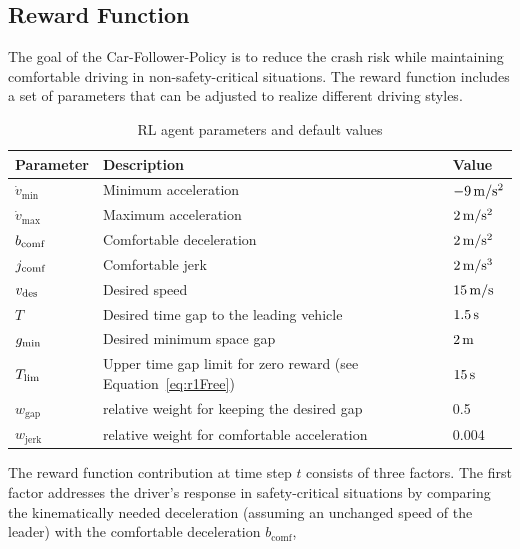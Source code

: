 \documentclass[review]{elsarticle}
\providecommand{\sub}[1]{_{\mathrm{#1}}}  %
\providecommand{\3}{{\ss}}
\begin{document}
	\subsection{Reward Function}
	\label{rewardFunctionFollow}
	The goal of the Car-Follower-Policy is to reduce the crash risk while
	maintaining comfortable driving in non-safety-critical situations. The
	reward function includes a set of parameters that can be
	adjusted to realize different driving styles. 
	
	\begin{table}
		\caption{RL agent parameters and default values} 
		\label{tab:agentParameters} 
		\begin{center}
			\begin{tabular}{ p{}| p{}| p{}}
				Parameter & Description & Value \\ \hline
				$\dot{v}\sub{min}$ & Minimum acceleration & $\unit[-9]{m/s^2}$ \\  
				$\dot{v}\sub{max}$ & Maximum acceleration & $\unit[2]{m/s^2}$ \\  
				$b_{\rm comf}$ & Comfortable deceleration & $\unit[2]{m/s^2}$ \\  
				$j_{\rm comf}$ & Comfortable jerk & $\unit[2]{m/s^3}$ \\  
				$v_{\rm des}$ & Desired speed & $\unit[15]{ m/s}$ \\  		
				$T$ & Desired time gap to the leading vehicle & $\unit[1.5]{s}$ \\
				$g_{\rm min}$ & Desired minimum space gap & $\unit[2]{m}$ \\
				$T_{\rm lim}$ & Upper time gap limit for zero reward (see
				Equation~\eqref{eq:r1Free}) & $\unit[15]{s}$ \\
				$w\sub{gap}$ & relative weight for keeping the desired gap & 0.5\\
				$w\sub{jerk}$ & relative weight for comfortable acceleration & 0.004\\
			\end{tabular}
		\end{center}
	\end{table}
	
	
	
	The reward function contribution at time step $t$ consists of three factors. 
	The first factor addresses the driver's
	response in safety-critical situations by comparing the
	kinematically needed deceleration (assuming an
	unchanged speed of the leader) with the
	comfortable deceleration $b\sub{comf}$,
	
\end{document}
